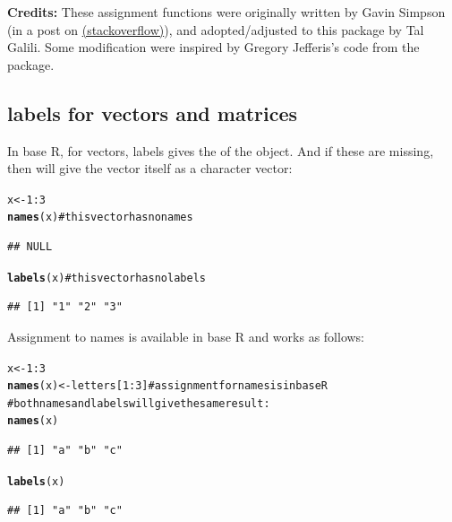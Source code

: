 \documentclass[shortnames,nojss,article]{jss}\usepackage{graphicx, color}
\makeatletter
\newcommand{\hlfunctioncall}[1]{\textcolor[rgb]{0.501960784313725,0,0.329411764705882}{\textbf{#1}}}%
\newcommand{\hlcomment}[1]{\textcolor[rgb]{0.180392156862745,0.6,0.341176470588235}{#1}}%
\newenvironment{kframe}{%
 \def\at@end@of@kframe{}%
 \ifinner\ifhmode%
  \def\at@end@of@kframe{\end{minipage}}%
  \begin{minipage}{\columnwidth}%
 \fi\fi%
 \def\FrameCommand##1{\hskip\@totalleftmargin \hskip-\fboxsep
 \colorbox{shadecolor}{##1}\hskip-\fboxsep
     \hskip-\linewidth \hskip-\@totalleftmargin \hskip\columnwidth}%
 \MakeFramed {\advance\hsize-\width
   \@totalleftmargin\z@ \linewidth\hsize
   \@setminipage}}%
 {\par\unskip\endMakeFramed%
 \at@end@of@kframe}
\newenvironment{knitrout}{}{} %
\makeatother
\begin{document}
\textbf{Credits:} These assignment functions were originally written by Gavin Simpson (in a post on \href{http://stackoverflow.com/questions/4614223/how-to-have-the-following-work-labelsx-some-value-r-question}{(stackoverflow)}), and adopted/adjusted to this package by Tal Galili. Some modification were inspired by Gregory Jefferis's code from the  package.


\subsection{labels for vectors and matrices}

In base R, for vectors, labels gives the  of the object. And if these are missing, then  will give the vector itself as a character vector:

\begin{knitrout}
\color{fgcolor}\begin{kframe}
\begin{alltt}
x <- 1:3
\hlfunctioncall{names}(x)  \hlcomment{# this vector has no names}
\end{alltt}
\begin{verbatim}
## NULL
\end{verbatim}
\begin{alltt}
\hlfunctioncall{labels}(x)  \hlcomment{# this vector has no labels}
\end{alltt}
\begin{verbatim}
## [1] "1" "2" "3"
\end{verbatim}
\end{kframe}
\end{knitrout}


Assignment to names is available in base R and works as follows:

\begin{knitrout}
\color{fgcolor}\begin{kframe}
\begin{alltt}
x <- 1:3
\hlfunctioncall{names}(x) <- letters[1:3]  \hlcomment{# assignment for names is in base R}
\hlcomment{# both names and labels will give the same result:}
\hlfunctioncall{names}(x)
\end{alltt}
\begin{verbatim}
## [1] "a" "b" "c"
\end{verbatim}
\begin{alltt}
\hlfunctioncall{labels}(x)
\end{alltt}
\begin{verbatim}
## [1] "a" "b" "c"
\end{verbatim}
\end{kframe}
\end{knitrout}
\end{document}
